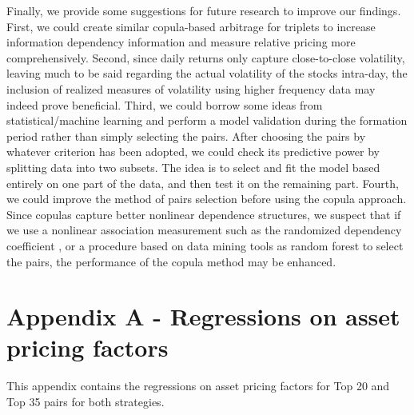 \documentclass[a4paper,12pt]{report}
\begin{document}
\begin{refsection}
Finally, we provide some suggestions for future research to improve our findings. First, we could create similar copula-based arbitrage for triplets to increase information dependency information and measure relative pricing more comprehensively. Second, since daily returns only capture close-to-close volatility, leaving much to be said regarding the actual volatility of the stocks intra-day, the inclusion of realized measures of volatility using higher frequency data may indeed prove beneficial. Third, we could borrow some ideas from statistical/machine learning and perform a model validation during the formation period rather than simply selecting the pairs. After choosing the pairs by whatever criterion has been adopted, we could check its predictive power by splitting data into two subsets. The idea is to select and fit the model based entirely on one part of the data, and then test it on the remaining part. Fourth, we could improve the method of pairs selection before using the copula approach. Since copulas capture better nonlinear dependence structures, we suspect that if we use a nonlinear association measurement such as the randomized dependency coefficient \citep{lopez2013randomized}, or a procedure based on data mining tools as random forest \citep{dlrz10} to select the pairs, the performance of the copula method may be enhanced. \\

%	
    \printbibliography[title={REFERENCES}]
    \end{refsection}
   

	
	\newpage
	
	\section*{Appendix A - Regressions on asset pricing factors}

	\vspace{0.6cm}
	
	\setcounter{table}{0}
	\renewcommand{\thetable}{A.\arabic{table}}
	
	
This appendix contains the regressions on asset pricing factors for Top 20 and Top 35 pairs for both strategies.
\end{document}
